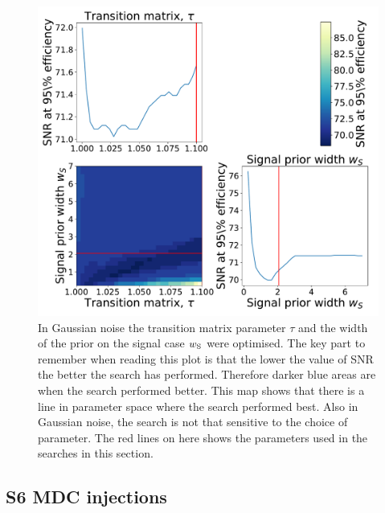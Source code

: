 \begin{figure}[h]
    \centering
    \includegraphics[width=0.9\linewidth]{C3_soap/gauss_optimised.pdf}
    \caption[Optimisation of line aware statistic in Gaussian noise.]{In Gaussian noise the transition matrix parameter $\tau$ and the width of the prior on the signal case $w_{\rm{S}}$ were optimised. The key part to remember when reading this plot is that the lower the value of \gls{SNR} the better the search has performed. Therefore darker blue areas are when the search performed better. This map shows that there is a line in parameter space where the search performed best. Also in Gaussian noise, the search is not that sensitive to the choice of parameter. The red lines on here shows the parameters used in the searches in this section.}
    \label{soap:las:optimisation:gaussplot}
\end{figure}

\clearpage

\subsection{\label{soap:las:optimisation:s6mdc}S6 \gls{MDC} injections}

